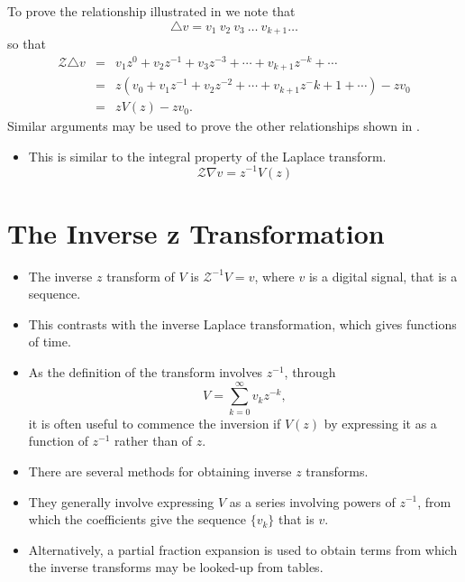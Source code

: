 To prove the relationship illustrated in  we note
that
\[\triangle v = v_1\ v_2\ v_3\ \ldots\ v_{k+1}\ldots\]
so that
\begin{eqnarray*}
  \mathcal{Z}\triangle v & = & v_1 z^0 + v_2 z^{-1} + v_3 z^{-3} + \cdots
  + v_{k+1}z^{-k}+\cdots \\
& = & z(v_0 + v_1 z^{-1} + v_2 z^{-2} + \cdots
  + v_{k+1}z^-{k+1}+\cdots)-zv_0\\
&=& zV(z) - zv_0.
\end{eqnarray*}
Similar arguments may be used to prove the other relationships
shown in .

\begin{slide}\label{slide:l8s3}
\begin{itemize}
\item  This is similar to the integral property of the Laplace
   transform.
  \[\mathcal{Z}\nabla v = z^{-1} V(z)\]
\end{itemize}

\end{slide}

\section*{The Inverse z Transformation}
\begin{slide}\label{slide:l8s4}
   \begin{itemize}
   \item The inverse $z$ transform of $V$ is $\mathcal{Z}^{-1} V = v$,
     where $v$ is a digital signal, that is a sequence.
   \item This contrasts with the inverse Laplace transformation, which
     gives functions of time.
   \item As the definition of the transform involves $z^{-1}$, through
     \[V=\sum_{k=0}^{\infty} v_k z^{-k},\] it is often useful to
     commence the inversion if $V(z)$ by expressing it as a function of
     $z^{-1}$ rather than of $z$.
   \end{itemize}
\end{slide}

\begin{slide}\label{slide:l8s5}
   \begin{itemize}
   \item There are several methods for obtaining inverse $z$
     transforms.
   \item They generally involve expressing $V$ as a series involving
     powers of $z^{-1}$, from which the coefficients give the sequence
     $\{v_k\}$ that is $v$.
   \item Alternatively, a partial fraction expansion is used to obtain
     terms from which the inverse transforms may be looked-up from tables.
   \end{itemize}
\end{slide}

